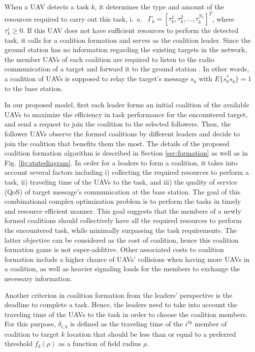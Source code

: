 \documentclass[conference]{IEEEtran}
\theoremstyle{remark}
\theoremstyle{lemma}
\begin{document}
When a UAV detects a task $k$, it determines the type and amount of the resources required to carry out this task, i.~e.~ $\Gamma_k = [\tau_{k}^1,\tau_{k}^2,\ldots,\tau_{k}^{N_r}]^T$, where $\tau_{k}^i \geq 0$. If this UAV does not have sufficient resources to perform the detected task, it calls for a coalition formation and serves as the coalition leader.
Since the ground station has no information regarding the existing targets in the network, the member UAVs of each coalition are required to listen to the radio communication of a target and forward it to the ground station \cite{UAVMilitary2016}. In other words, a coalition of UAVs is supposed to relay the target's message $s_k$ with $E\{s_k^*s_k\} = 1$ to the base station.

In our proposed model, first each leader forms an initial coalition of the available UAVs to maximize the efficiency in task performance for the encountered target, and send a request to join the coalition to the selected followers. Then, the follower UAVs observe the formed coalitions by different leaders and decide to join the coalition that benefits them the most. The details of the proposed coalition formation algorithm is described in Section \ref{sec:formation} as well as in Fig. \ref{fig:statediagram}. In order for a leaders to form a coalition, it takes into account several factors including i) collecting the required resources to perform a task, ii) traveling time of the UAVs to the task, and iii) the quality of service (QoS) of target message's communication at the base station. The goal of this combinational complex optimization problem is to perform the tasks in timely and resource efficient manner. This goal suggests that the members of a newly formed coalitions should collectively have all the required resources to perform the encountered task, while minimally surpassing the task requirements. The latter objective can be considered as the cost of coalition, hence this coalition formation game is  not super-additive. Other associated costs to coalition formation include a higher chance of UAVs' collisions when having more UAVs in a coalition, as well as heavier signaling loads for the members to exchange the necessary information.

Another criterion in coalition formation from the leaders' perspective is the deadline to complete a task. Hence, the leaders need to take into account the traveling time of the UAVs to the task in order to choose the coalition members. For this purpose, $\delta_{i,k}$ is defined as the traveling time of the $i^{\text{th}}$ member of coalition to target $k$ location that should be less than or equal to a preferred threshold $f_{\delta}(\rho)$ as a function of field radius $\rho$.
\end{document}
